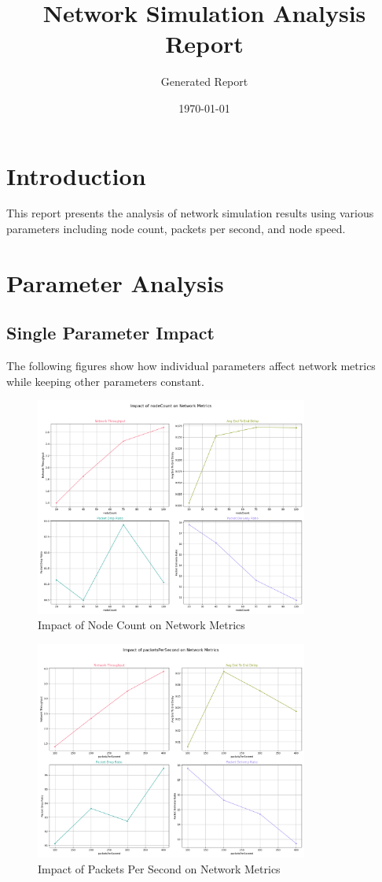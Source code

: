 \documentclass{article}
\title{Network Simulation Analysis Report}
\author{Generated Report}
\date{\today}
\begin{document}
\maketitle

\section{Introduction}
This report presents the analysis of network simulation results using various parameters including node count, packets per second, and node speed.

\section{Parameter Analysis}
\subsection{Single Parameter Impact}
The following figures show how individual parameters affect network metrics while keeping other parameters constant.

\begin{figure}[h]
\centering
\includegraphics[width=0.8\textwidth]{plots/task-1/single-input-params/analysis_nodeCount}
\caption{Impact of Node Count on Network Metrics}
\end{figure}

\begin{figure}[h]
\centering
\includegraphics[width=0.8\textwidth]{plots/task-1/single-input-params/analysis_packetsPerSecond}
\caption{Impact of Packets Per Second on Network Metrics}
\end{figure}
\end{document}
